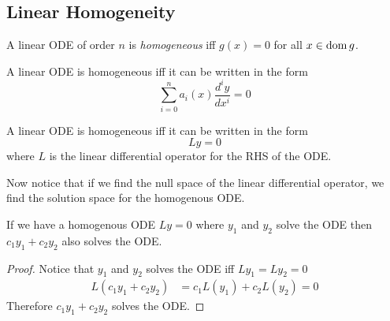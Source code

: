 \documentclass[notes]{subfiles}
\begin{document}
\subsection{Linear Homogeneity}
\begin{definition}
    A linear ODE of order $n$ is \textit{homogeneous} iff $g(x) = 0$ for all $x \in \operatorname{dom} g$.
\end{definition}
\begin{lemma}
    A linear ODE is homogeneous iff it can be written in the form
    \[
        \sum_{i = 0}^n a_i(x)\frac{d^i y}{dx^i} = 0
    \]
\end{lemma}
\begin{lemma}
    A linear ODE is homogeneous iff it can be written in the form
    \[
        Ly = 0
    \]
    where $L$ is the linear differential operator for the RHS of the ODE.
\end{lemma}
Now notice that if we find the null space of the linear differential operator, we find the solution space for the homogenous ODE.

\begin{theorem}
    If we have a homogenous ODE $Ly = 0$ where $y_1$ and $y_2$ solve the ODE then $c_1y_1 + c_2y_2$ also solves the ODE.
\end{theorem}
\begin{proof}
    Notice that $y_1$ and $y_2$ solves the ODE iff $Ly_1 = Ly_2 = 0$
    \begin{align*}
        L(c_1y_1 + c_2y_2)
        &= c_1L(y_1) + c_2L(y_2)
        = 0
    \end{align*}
    Therefore $c_1y_1 + c_2y_2$ solves the ODE.
\end{proof}
\end{document}
